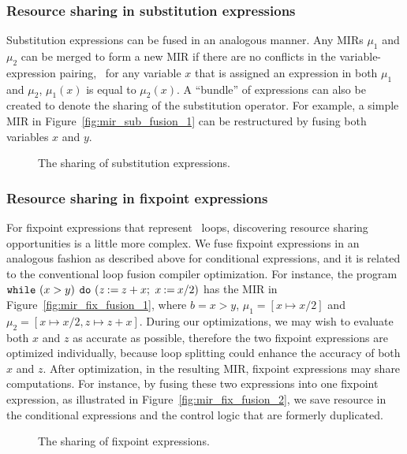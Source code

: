 \subsubsection{Resource sharing in substitution expressions}

Substitution expressions can be fused in an analogous manner.  Any MIRs
$\mu_1$ and $\mu_2$ can be merged to form a new MIR if there are no conflicts
in the variable-expression pairing, \ie~for any variable $x$ that is
assigned an expression in both $\mu_1$ and $\mu_2$, $\mu_1(x)$ is equal
to $\mu_2(x)$.  A ``bundle'' of expressions can also be created to denote
the sharing of the substitution operator.  For example, a simple MIR in
Figure~\ref{fig:mir_sub_fusion_1} can be restructured by fusing both variables
$x$ and $y$.
\begin{figure}[ht]
    \centering
    \caption{The sharing of substitution expressions.}
\end{figure}

\subsubsection{Resource sharing in fixpoint expressions}

For fixpoint expressions that represent \whilelit~loops, discovering
resource sharing opportunities is a little more complex.  We fuse
fixpoint expressions in an analogous fashion as described above for
conditional expressions, and it is related to the conventional loop fusion
compiler optimization.  For instance, the program $\texttt{while}~(x > y)$
$\texttt{do}~(z\mathbin{:=}{z + x} \mathbin{;}$ $x\mathbin{:=}{x / 2})$ has the
MIR in Figure~\ref{fig:mir_fix_fusion_1}, where $b = x > y$, $\mu_1 = [x
\mapsto x / 2]$ and $\mu_2 = [x \mapsto x / 2, z \mapsto z + x]$.  During
our optimizations, we may wish to evaluate both $x$ and $z$ as accurate as
possible, therefore the two fixpoint expressions are optimized individually,
because loop splitting could enhance the accuracy of both $x$ and $z$.
After optimization, in the resulting MIR, fixpoint expressions may share
computations.  For instance, by fusing these two expressions into one fixpoint
expression, as illustrated in Figure~\ref{fig:mir_fix_fusion_2}, we save
resource in the conditional expressions and the control logic that are formerly
duplicated.
\begin{figure}[ht]
    \centering
    \caption{The sharing of fixpoint expressions.}
\end{figure}

